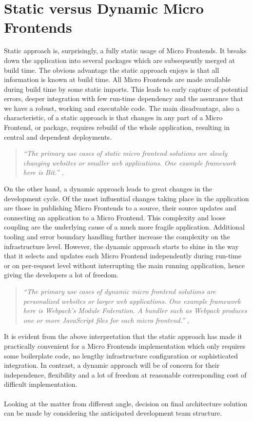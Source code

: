 \documentclass[a4paper]{book}
\begin{document}
\section{Static versus Dynamic Micro Frontends}
Static approach is, surprisingly, a fully static usage of Micro Frontends. It breaks down the application into several packages which are subsequently merged at build time. The obvious advantage the static approach enjoys is that all information is known at build time. All Micro Frontends are made available during build time by some static imports. This leads to early capture of potential errors, deeper integration with few run-time dependency and the assurance that we have a robust, working and executable code. The main disadvantage, also a characteristic, of a static approach is that changes in any part of a Micro Frontend, or package, requires rebuild of the whole application, resulting in central and dependent deployments. \cite{Rap20}
\begin{quote}
    \textit{“The primary use cases of static micro frontend solutions are slowly changing websites or smaller web applications. One example framework here is Bit.” \cite{Bit15}, \cite{Rap20}}
\end{quote}

On the other hand, a dynamic approach leads to great changes in the development cycle. Of the most influential changes taking place in the application are those in publishing Micro Frontends to a source, their source updates and connecting an application to a Micro Frontend. This complexity and loose coupling are the underlying cause of a much more fragile application. Additional tooling and error boundary handling further increase the complexity on the infrastructure level. However, the dynamic approach starts to shine in the way that it selects and updates each Micro Frontend independently during run-time or on per-request level without interrupting the main running application, hence giving the developers a lot of freedom. \cite{Rap20} 
\begin{quote}
\textit{“The primary use cases of dynamic micro frontend solutions are personalized websites or larger web applications. One example framework here is Webpack's Module Federation. A bundler such as Webpack produces one or more JavaScript files for each micro frontend.”} \cite{Webpack}, \cite{Rap20}
\end{quote}

It is evident from the above interpretation that the static approach has made it practically convenient for a Micro Frontends implementation which only requires some boilerplate code, no lengthy infrastructure configuration or sophisticated integration. In contrast, a dynamic approach will be of concern for their independence, flexibility and a lot of freedom at reasonable corresponding cost of difficult implementation. 
\\ \\
Looking at the matter from different angle, decision on final architecture solution can be made by considering the anticipated development team structure.
\end{document}
